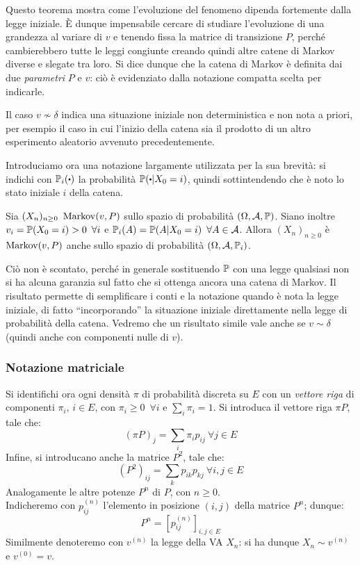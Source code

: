 Questo teorema mostra come l'evoluzione del fenomeno dipenda fortemente dalla legge iniziale.
È dunque impensabile cercare di studiare l'evoluzione di una grandezza al variare di $v$ e
tenendo fissa la matrice di transizione $P$, perché cambierebbero tutte le leggi congiunte
creando quindi altre catene di Markov diverse e slegate tra loro.
Si dice dunque che la catena di Markov è definita dai due \emph{parametri} $P$ e $v$:
ciò è evidenziato dalla notazione compatta scelta per indicarle.

Il caso $v \not\sim \delta$ indica una situazione iniziale non deterministica e non nota a priori,
per esempio il caso in cui l'inizio della catena sia il prodotto di un altro esperimento aleatorio avvenuto precedentemente.

Introduciamo ora una notazione largamente utilizzata per la sua brevità: si indichi con $\PP_i(\bigcdot)$ la probabilità $\PP(\bigcdot | X_0 = i)$, quindi sottintendendo che è noto lo stato iniziale $i$ della catena.

\begin{coro}\label{coro-mark}
	Sia $(X_n)_{n \ge 0} \ \operatorname{Markov}(v,P)$ sullo spazio di probabilità $(\Omega, \mathcal A, \mathbb P)$.
	Siano inoltre $v_i = \mathbb P(X_0=i) > 0 \enspace \forall i$ e $\mathbb P_i(A) = \mathbb P(A | X_0=i) \enspace \forall A \in \mathcal A$.
	Allora $(X_n)_{n \ge 0}$ è $\operatorname{Markov}(v,P)$ anche sullo spazio di probabilità $(\Omega,\mathcal A,\mathbb P_i)$.
\end{coro}
Ciò non è scontato, perché in generale sostituendo $\mathbb P$ con una legge qualsiasi non si ha alcuna garanzia sul fatto che si ottenga ancora una catena di Markov.
Il risultato permette di semplificare i conti e la notazione quando è nota la legge iniziale, di fatto ``incorporando'' la situazione iniziale direttamente nella legge di probabilità della catena.
Vedremo che un risultato simile vale anche se $v \sim \delta$ (quindi anche con componenti nulle di $v$). \\

\subsubsection{Notazione matriciale}
Si identifichi ora ogni densità $\pi$ di probabilità discreta su $E$ con un \emph{vettore riga} di componenti $\pi_i$, $i \in E$, con $\pi_i \ge 0 \enspace \forall i$ e $\sum_i \pi_i = 1$.
Si introduca il vettore riga $\pi P$, tale che:
$$(\pi P)_j = \sum_i \pi_i p_{ij} \ \forall j \in E$$
Infine, si introducano anche la matrice $P^2$, tale che:
$$(P^2)_{ij} = \sum_k p_{ik} p_{kj} \ \forall i,j \in E$$
Analogamente le altre potenze $P^n$ di $P$, con $n \ge 0$. \\
Indicheremo con $p_{ij}^{(n)}$ l'elemento in posizione $(i,j)$ della matrice $P^n$; dunque:
$$P^n = \left[ p_{ij}^{(n)} \right]_{i,j \in E}$$
Similmente denoteremo con $v^{(n)}$ la legge della VA $X_n$: si ha dunque $X_n \sim v^{(n)}$ e $v^{(0)} = v$. \\

